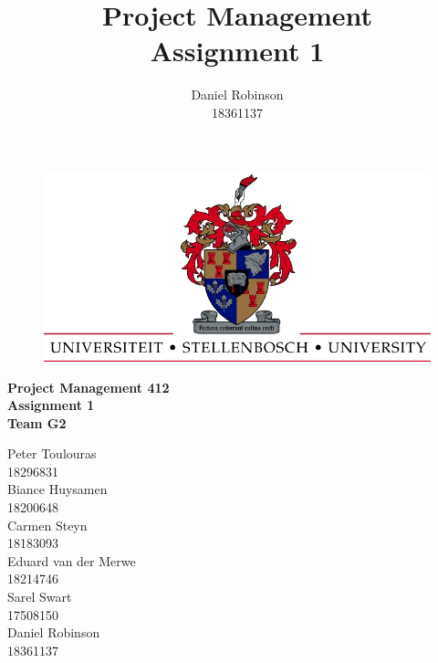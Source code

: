 


\title{Project Management\\Assignment 1}
\author{Daniel Robinson\\18361137}


    \begin{titlepage}
        \begin{center}
            \vspace*{1cm}
            
            \begin{figure}
			\centering
            \includegraphics[scale=2]{UScrest-top.jpg}
            \end{figure}
            
            \huge
            \textbf{Project Management 412\\Assignment 1\\Team G2}
            
            \vspace{1.5cm}
            
            \large
            Peter Toulouras\\
            18296831\\
            \vspace{0.5cm}
            Biance Huysamen\\
            18200648\\
            \vspace{0.5cm}
            Carmen Steyn\\
            18183093\\
            \vspace{0.5cm}
            Eduard van der Merwe\\
            18214746\\
            \vspace{0.5cm}
            Sarel Swart\\
            17508150\\
            \vspace{0.5cm}
            Daniel Robinson\\
            18361137\\
            \vspace{3.5cm}
            

\end{center}
\end{titlepage}
